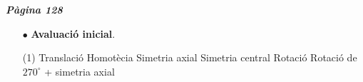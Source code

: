 \documentclass[a4paper, pdf, twoside]{book}
\begin{document}
\begin{multicols}{2}
 

\vspace*{0.4cm}
 {}
\vspace{0.3cm}


{\textbf{\em Pàgina 128}} \hrulefill
\begin{enumerate}
\vspace{0.25cm}



 \item[$\bullet$ ] {\selectfont\color{blue}\textbf{Avaluació inicial}. } 
 \begin{tasks}[column-sep=1em, item-indent=1.3333em](1)
	 \task Translació
	 \task Homotècia
	 \task Simetria axial
	 \task Simetria central
	 \task Rotació
	 \task* Rotació de $270^\circ $ + simetria axial
\end{tasks}
 \end{enumerate}
\vspace{0.3cm}



\end{multicols}
\end{document}
